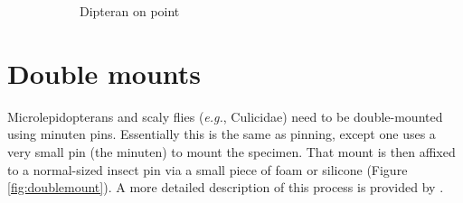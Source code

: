 \begin{figure}[ht!]
\begin{subfigure}[ht!]{0.31\textwidth}
        \caption{Dipteran on point \citep[][Fig. 24]{USDAmanual1986}}
        \label{fig:flypoint}
    \end{subfigure}
    \caption{}\label{fig:points}
\end{figure}

\section{Double mounts}\label{doublemount}
Microlepidopterans and scaly flies (\textit{e.g.}, Culicidae) need to be double-mounted using minuten pins. Essentially this is the same as pinning, except one uses a very small pin (the minuten) to mount the specimen. That mount is then affixed to a normal-sized insect pin via a small piece of foam or silicone (Figure \ref{fig:doublemount}). A more detailed description of this process is provided by \cite{GrinterWebpage}.

